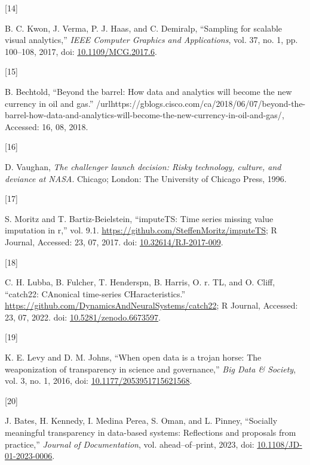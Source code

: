 \documentclass{article}
\newlength{\cslhangindent}
\newlength{\csllabelwidth}
\newlength{\cslentryspacingunit} %
\newenvironment{CSLReferences}[2] %
 {%
  \setlength{\parindent}{0pt}
  \ifodd #1
  \let\oldpar\par
  \def\par{\hangindent=\cslhangindent\oldpar}
  \fi
  \setlength{\parskip}{#2\cslentryspacingunit}
 }%
 {}
\newcommand{\CSLLeftMargin}[1]{\parbox[t]{\csllabelwidth}{#1}}
\newcommand{\CSLRightInline}[1]{\parbox[t]{\linewidth - \csllabelwidth}{#1}\break}
\begin{document}
\begin{CSLReferences}{0}{0}
\leavevmode{}%
\CSLLeftMargin{{[}14{]} }
\CSLRightInline{B. C. Kwon, J. Verma, P. J. Haas, and C. Demiralp,
{``Sampling for scalable visual analytics,''} \emph{IEEE Computer
Graphics and Applications}, vol. 37, no. 1, pp. 100--108, 2017, doi:
\href{https://doi.org/10.1109/MCG.2017.6}{10.1109/MCG.2017.6}.}

\leavevmode{}%
\CSLLeftMargin{{[}15{]} }
\CSLRightInline{B. Bechtold, {``Beyond the barrel: How data and
analytics will become the new currency in oil and gas.''}
/url{https://gblogs.cisco.com/ca/2018/06/07/beyond-the-barrel-how-data-and-analytics-will-become-the-new-currency-in-oil-and-gas/},
Accessed: 16, 08, 2018.}

\leavevmode{}%
\CSLLeftMargin{{[}16{]} }
\CSLRightInline{D. Vaughan, \emph{The challenger launch decision: Risky
technology, culture, and deviance at NASA}. Chicago; London: The
University of Chicago Press, 1996.}

\leavevmode{}%
\CSLLeftMargin{{[}17{]} }
\CSLRightInline{S. Moritz and T. Bartiz-Beielstein, {``imputeTS: Time
series missing value imputation in r,''} vol. 9.1.
\url{https://github.com/SteffenMoritz/imputeTS}; R Journal, Accessed:
23, 07, 2017. doi:
\href{https://doi.org/10.32614/RJ-2017-009}{10.32614/RJ-2017-009}.}

\leavevmode{}%
\CSLLeftMargin{{[}18{]} }
\CSLRightInline{C. H. Lubba, B. Fulcher, T. Henderspn, B. Harris, O. r.
TL, and O. Cliff, {``catch22: CAnonical time-series CHaracteristics.''}
\url{https://github.com/DynamicsAndNeuralSystems/catch22}; R Journal,
Accessed: 23, 07, 2022. doi:
\href{https://doi.org/10.5281/zenodo.6673597}{10.5281/zenodo.6673597}.}

\leavevmode{}%
\CSLLeftMargin{{[}19{]} }
\CSLRightInline{K. E. Levy and D. M. Johns, {``When open data is a
trojan horse: The weaponization of transparency in science and
governance,''} \emph{Big Data \& Society}, vol. 3, no. 1, 2016, doi:
\href{https://doi.org/10.1177/2053951715621568}{10.1177/2053951715621568}.}

\leavevmode{}%
\CSLLeftMargin{{[}20{]} }
\CSLRightInline{J. Bates, H. Kennedy, I. Medina Perea, S. Oman, and L.
Pinney, {``Socially meaningful transparency in data-based systems:
Reflections and proposals from practice,''} \emph{Journal of
Documentation}, vol. ahead--of--print, 2023, doi:
\href{https://doi.org/10.1108/JD-01-2023-0006}{10.1108/JD-01-2023-0006}.}


\end{CSLReferences}
\end{document}
